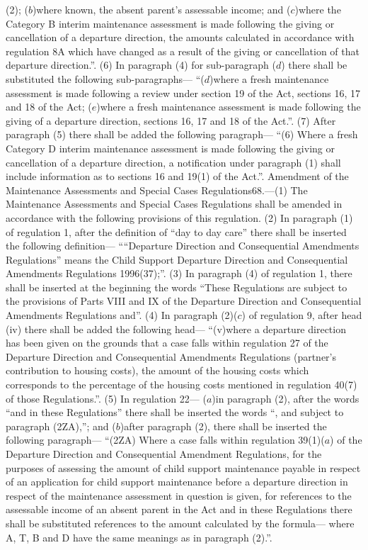\documentclass[a4paper]{article}
\begin{document}
(2);
($b$)where known, the absent parent’s assessable income; and
($c$)where the Category B interim maintenance assessment is made following the
giving or cancellation of a departure direction, the amounts calculated in
accordance with regulation 8A which have changed as a result of the giving or
cancellation of that departure direction.”.
(6) In paragraph (4) for sub-paragraph ($d$) there shall be substituted the
following sub-paragraphs—
“($d$)where a fresh maintenance assessment is made following a review under
section 19 of the Act, sections 16, 17 and 18 of the Act;
($e$)where a fresh maintenance assessment is made following the giving of a
departure direction, sections 16, 17 and 18 of the Act.”.
(7) After paragraph (5) there shall be added the following paragraph—
“(6) Where a fresh Category D interim maintenance assessment is made following
the giving or cancellation of a departure direction, a notification under
paragraph (1) shall include information as to sections 16 and 19(1) of the
Act.”.
Amendment of the Maintenance Assessments and Special Cases Regulations68.—(1)
The Maintenance Assessments and Special Cases Regulations shall be amended in
accordance with the following provisions of this regulation.
(2) In paragraph (1) of regulation 1, after the definition of “day to day care”
there shall be inserted the following definition—
““Departure Direction and Consequential Amendments Regulations” means the Child
Support Departure Direction and Consequential Amendments Regulations 1996(37);”.
(3) In paragraph (4) of regulation 1, there shall be inserted at the beginning
the words “These Regulations are subject to the provisions of Parts VIII and IX
of the Departure Direction and Consequential Amendments Regulations and”.
(4) In paragraph (2)($c$) of regulation 9, after head (iv) there shall be added
the following head—
“(v)where a departure direction has been given on the grounds that a case falls
within regulation 27 of the Departure Direction and Consequential Amendments
Regulations (partner’s contribution to housing costs), the amount of the housing
costs which corresponds to the percentage of the housing costs mentioned in
regulation 40(7) of those Regulations.”.
(5) In regulation 22—
($a$)in paragraph (2), after the words “and in these Regulations” there shall be
inserted the words “, and subject to paragraph (2ZA),”; and
($b$)after paragraph (2), there shall be inserted the following paragraph—
“(2ZA) Where a case falls within regulation 39(1)($a$) of the Departure Direction
and Consequential Amendment Regulations, for the purposes of assessing the
amount of child support maintenance payable in respect of an application for
child support maintenance before a departure direction in respect of the
maintenance assessment in question is given, for references to the assessable
income of an absent parent in the Act and in these Regulations there shall be
substituted references to the amount calculated by the formula—
where A, T, B and D have the same meanings as in paragraph (2).”.
\end{document}
